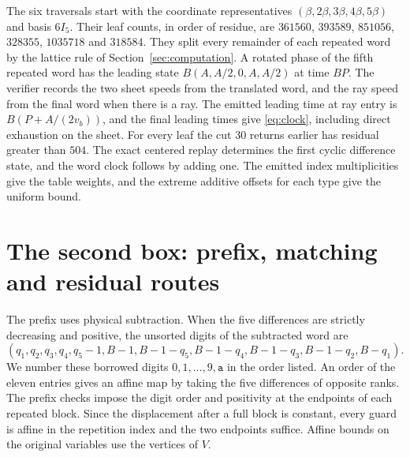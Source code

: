 \documentclass[11pt,reqno]{amsart}
\theoremstyle{remark}
\begin{document}
The six traversals start with the coordinate representatives \((\beta,2\beta,3\beta,4\beta,5\beta)\) and basis \(6I_5\). Their leaf counts, in order of residue, are
\(361560\), \(393589\), \(851056\), \(328355\), \(1035718\) and \(318584\).
They split every remainder of each repeated word by the lattice rule of Section~\ref{sec:computation}. A rotated phase of the fifth repeated word has the leading state \(B(A,A/2,0,A,A/2)\) at time \(BP\). The verifier records the two sheet speeds from the translated word, and the ray speed from the final word when there is a ray. The emitted leading time at ray entry is \(B(P+A/(2v_b))\), and the final leading times give \eqref{eq:clock}, including direct exhaustion on the sheet. For every leaf the cut \(30\) returns earlier has residual greater than \(504\). The exact centered replay determines the first cyclic difference state, and the word clock follows by adding one. The emitted index multiplicities give the table weights, and the extreme additive offsets for each type give the uniform bound.

\section{The second box: prefix, matching and residual routes}\label{app:box}

The prefix uses physical subtraction. When the five differences are strictly decreasing and positive, the unsorted digits of the subtracted word are
\[
 (q_1,q_2,q_3,q_4,q_5-1,B-1,B-1-q_5,B-1-q_4,B-1-q_3,B-1-q_2,B-q_1).
\]
We number these borrowed digits \(0,1,\ldots,9,\mathtt a\) in the order listed. An order of the eleven entries gives an affine map by taking the five differences of opposite ranks. The prefix checks impose the digit order and positivity at the endpoints of each repeated block. Since the displacement after a full block is constant, every guard is affine in the repetition index and the two endpoints suffice. Affine bounds on the original variables use the vertices of \(V\).
\end{document}

